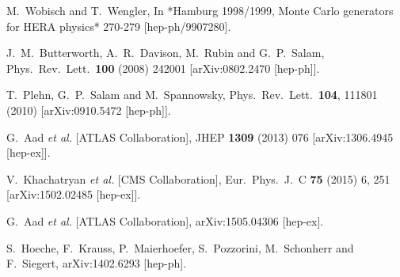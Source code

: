 \documentclass[preprintnumbers,superscriptaddress,nofootinbib,aps,prd,floatfix]{revtex4}
\begin{document}
\begin{thebibliography}{99}
  M.~Wobisch and T.~Wengler,
  In *Hamburg 1998/1999, Monte Carlo generators for HERA physics* 270-279
  [hep-ph/9907280].
  
  
  J.~M.~Butterworth, A.~R.~Davison, M.~Rubin and G.~P.~Salam,
  Phys.\ Rev.\ Lett.\  {\bf 100} (2008) 242001
  [arXiv:0802.2470 [hep-ph]].
        
        
  T.~Plehn, G.~P.~Salam and M.~Spannowsky,
  Phys.\ Rev.\ Lett.\  {\bf 104}, 111801 (2010)
  [arXiv:0910.5472 [hep-ph]].
  

  G.~Aad {\it et al.}  [ATLAS Collaboration],
  JHEP {\bf 1309} (2013) 076
  [arXiv:1306.4945 [hep-ex]].
              
  
  
  V.~Khachatryan {\it et al.} [CMS Collaboration],
  Eur.\ Phys.\ J.\ C {\bf 75} (2015) 6,  251
  [arXiv:1502.02485 [hep-ex]].
  
  G.~Aad {\it et al.} [ATLAS Collaboration],
  arXiv:1505.04306 [hep-ex].
  
  S.~Hoeche, F.~Krauss, P.~Maierhoefer, S.~Pozzorini, M.~Schonherr and F.~Siegert,
  arXiv:1402.6293 [hep-ph].
  

\end{thebibliography}
\end{document}
